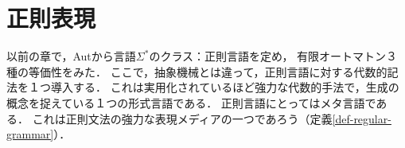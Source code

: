 \section{正則表現}

\begin{tcolorbox}[colframe=ForestGreen, colback=ForestGreen!10!white, breakable,
    title=正則言語hack：適宜適切な代数的手法で有限生成して正則言語を得る代数的表現]
    以前の章で，Autから言語$\Sigma^*$のクラス：正則言語を定め，
    有限オートマトン３種の等価性をみた．
    ここで，抽象機械とは違って，正則言語に対する代数的記法を１つ導入する．
    これは実用化されているほど強力な代数的手法で，生成の概念を捉えている１つの形式言語である．
    正則言語にとってはメタ言語である．
    これは正則文法の強力な表現メディアの一つであろう（定義\ref{def-regular-grammar}）．
\end{tcolorbox}


